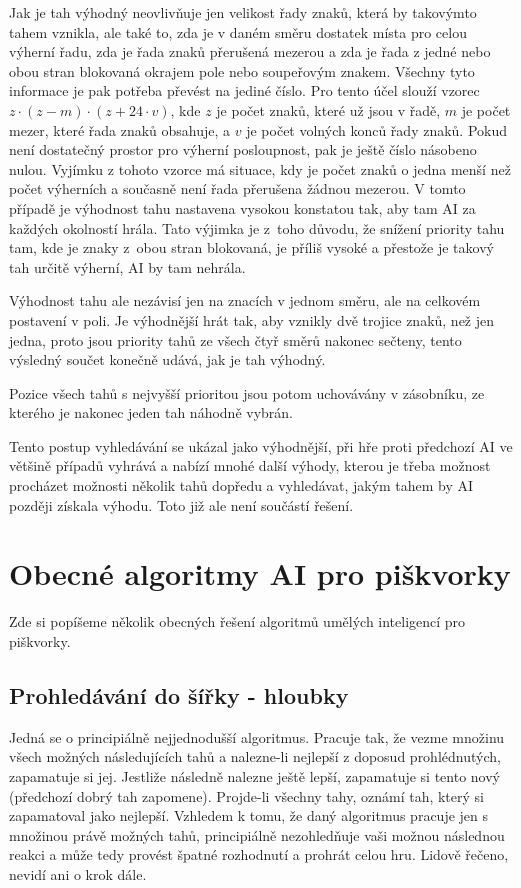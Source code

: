 \documentclass[a4paper,11pt,titlepage]{article}
\begin{document}
Jak je tah výhodný neovlivňuje jen velikost řady znaků, která by takovýmto tahem vznikla, ale také to, zda je v daném směru dostatek místa pro celou výherní řadu, zda je řada znaků přerušená mezerou a zda je řada z jedné nebo obou stran blokovaná okrajem pole nebo soupeřovým znakem. Všechny tyto informace je pak potřeba převést na jediné číslo. Pro tento účel slouží vzorec $z \cdot (z - m) \cdot (z + 24\cdot v)$, kde $z$ je počet znaků, které už jsou v řadě, $m$ je počet mezer, které řada znaků obsahuje, a $v$ je počet volných konců řady znaků. Pokud není dostatečný prostor pro výherní posloupnost, pak je ještě číslo násobeno nulou. Vyjímku z tohoto vzorce má situace, kdy je počet znaků o jedna menší než počet výherních a současně není řada přerušena žádnou mezerou. V tomto případě je výhodnost tahu nastavena vysokou konstatou tak, aby tam AI za každých okolností hrála. Tato výjimka je z~toho důvodu, že snížení priority tahu tam, kde je znaky z~obou stran blokovaná, je příliš vysoké a přestože je takový tah určitě výherní, AI by tam nehrála.

Výhodnost tahu ale nezávisí jen na znacích v jednom směru, ale na celkovém postavení v poli. Je výhodnější hrát tak, aby vznikly dvě trojice znaků, než jen jedna, proto jsou priority tahů ze všech čtyř směrů nakonec sečteny, tento výsledný součet konečně udává, jak je tah výhodný.

Pozice všech tahů s nejvyšší prioritou jsou potom uchovávány v zá\-sob\-níku, ze kterého je nakonec jeden tah náhodně vybrán.

Tento postup vyhledávání se ukázal jako výhodnější, při hře proti před\-cho\-zí AI ve většině případů vyhrává a nabízí mnohé další výhody, kterou je třeba možnost procházet možnosti několik tahů dopředu a vyhledávat, jakým tahem by AI později získala výhodu. Toto již ale není součástí řešení.
\section{Obecné algoritmy AI pro piškvorky}
Zde si popíšeme několik obecných řešení algoritmů umělých inteligencí pro piškvorky.
\subsection{Prohledávání do šířky - hloubky}
Jedná se o principiálně nejjednodušší algoritmus. Pracuje tak, že vezme množinu
všech možných následujících tahů a nalezne-li nejlepší z doposud prohlédnutých,
zapamatuje si jej. Jestliže následně nalezne ještě lepší, zapamatuje si tento nový
(předchozí dobrý tah zapomene). Projde-li všechny tahy, oznámí tah, který si
zapamatoval jako nejlepší.
Vzhledem k tomu, že daný algoritmus pracuje jen s množinou právě možných tahů,
principiálně nezohledňuje vaši možnou následnou reakci a může tedy provést špatné
rozhodnutí a prohrát celou hru. Lidově řečeno, nevidí ani o krok dále.
\end{document}
